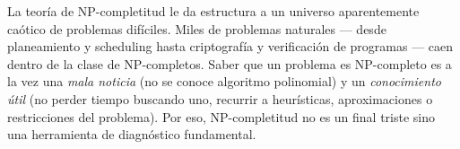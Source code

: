 \documentclass[11pt,a4paper]{article}
\theoremstyle{definicion}
\begin{document}
\begin{intuicion}
La teoría de NP-completitud le da estructura a un universo aparentemente caótico de problemas difíciles. Miles de problemas naturales --- desde planeamiento y scheduling hasta criptografía y verificación de programas --- caen dentro de la clase de NP-completos. Saber que un problema es NP-completo es a la vez una \emph{mala noticia} (no se conoce algoritmo polinomial) y un \emph{conocimiento útil} (no perder tiempo buscando uno, recurrir a heurísticas, aproximaciones o restricciones del problema). Por eso, NP-completitud no es un final triste sino una herramienta de diagnóstico fundamental.
\end{intuicion}
\end{document}
